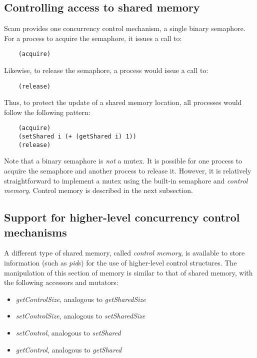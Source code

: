 \subsection{Controlling access to shared memory}

Scam provides one concurrency control mechanism, a single binary
semaphore. For a process to acquire the semaphore, it issues a call to:

\begin{verbatim}
    (acquire)
\end{verbatim}

Likewise, to release the semaphore, a process would issue a call to:

\begin{verbatim}
    (release)
\end{verbatim}

Thus, to protect the update of a shared memory location, all processes
would follow the following pattern:

\begin{verbatim}
    (acquire)
    (setShared i (+ (getShared i) 1))
    (release)
\end{verbatim}

Note that a binary semaphore is {\it not} a mutex. It is possible for
one process to acquire the semaphore and another process to release it.
However, it is relatively straightforward to implement a mutex using
the built-in semaphore and {\it control memory}.
Control memory is described in the next subsection.

\subsection{Support for higher-level concurrency control mechanisms}

A different type of shared memory, called {\it control memory},
is available to store
information (such as {\it pid}s) for the use of higher-level control
structures. The manipulation of this section of memory is similar to
that of shared memory, with the following accessors and mutators:

\begin{itemize}
\item
        {\it getControlSize}, analogous to {\it getSharedSize}
\item
        {\it setControlSize}, analogous to {\it setSharedSize}
\item
        {\it setControl}, analogous to {\it setShared}
\item
        {\it getControl}, analogous to {\it getShared}
\end{itemize}

